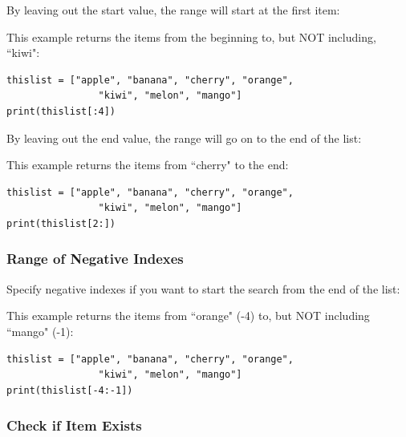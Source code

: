 \documentclass[12pt,a4paper]{article}
\begin{document}
By leaving out the start value, the range will start at the first item:

\begin{ebox}
This example returns the items from the beginning to, but NOT including, ``kiwi":
	\begin{lstlisting}
thislist = ["apple", "banana", "cherry", "orange",
				"kiwi", "melon", "mango"]
print(thislist[:4])
	\end{lstlisting}
\tcblower
	\begin{vercode}
	\end{vercode}
\end{ebox}

By leaving out the end value, the range will go on to the end of the list:

\begin{ebox}
This example returns the items from ``cherry" to the end:
	\begin{lstlisting}
thislist = ["apple", "banana", "cherry", "orange",
                "kiwi", "melon", "mango"]
print(thislist[2:])
	\end{lstlisting}
\tcblower
	\begin{vercode}
	\end{vercode}
\end{ebox}
\subsubsection{Range of Negative Indexes}

Specify negative indexes if you want to start the search from
the end of the list:

\begin{ebox}
This example returns the items from ``orange" (-4) to, but NOT including ``mango" (-1):
	\begin{lstlisting}
thislist = ["apple", "banana", "cherry", "orange",
                "kiwi", "melon", "mango"]
print(thislist[-4:-1])
	\end{lstlisting}
\tcblower
	\begin{vercode}
	\end{vercode}
\end{ebox}
\subsubsection{Check if Item Exists}
\end{document}
